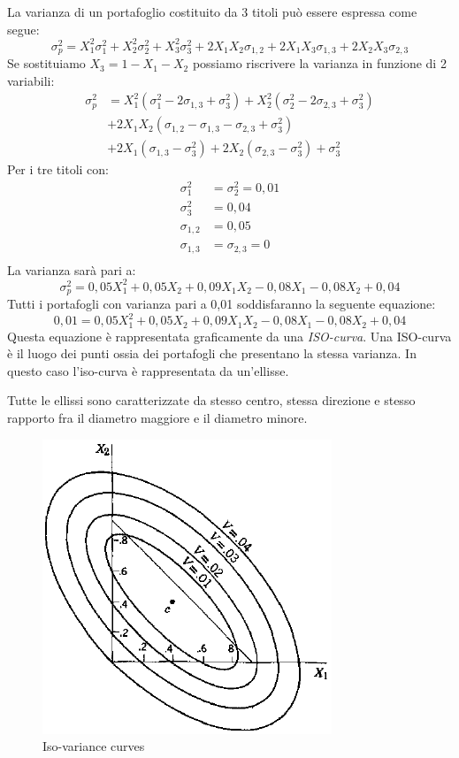 La varianza di un portafoglio costituito da 3 titoli può essere espressa come segue:
\begin{equation}
\label{key}
\sigma^{2}_{p} = X_{1}^2 \sigma^{2}_{1}+X_{2}^2 \sigma^{2}_{2}+X_{3}^2 \sigma^{2}_{3} + 2  X_{1}  X_{2}\sigma_{1,2}+2  X_{1}  X_{3}  \sigma_{1,3}+2  X_{2}  X_{3}  \sigma_{2,3} 
\end{equation}
Se sostituiamo $X_{3}= 1- X_{1}- X_{2}$ possiamo riscrivere la varianza in funzione di 2 variabili: 
\begin{equation}
\begin{split}
\label{key}
\sigma^{2}_{p} & =X_{1}^2(\sigma^{2}_{1}-2\sigma_{1,3}+\sigma^{2}_{3})+X_{2}^2(\sigma^{2}_{2}-2\sigma_{2,3}+\sigma^{2}_{3})\\
&+2X_{1}X_{2}(\sigma_{1,2}-\sigma_{1,3}-\sigma_{2,3}+\sigma^{2}_{3}) \\
&+2X_{1}(\sigma_{1,3}-\sigma^{2}_{3})+2X_{2}(\sigma_{2,3}-\sigma^{2}_{3})+\sigma^{2}_{3}
\nonumber
\end{split}
\end{equation}
Per i tre titoli con:
\begin{equation}
\begin{split}
\sigma^{2}_{1}&=\sigma^{2}_{2}=0,01 \\
\sigma^{2}_{3}&=0,04\\
\sigma_{1,2}&=0,05\\
\sigma_{1,3}&=\sigma_{2,3}=0\\
\nonumber
\end{split}
\end{equation}
La varianza sarà pari a:
\begin{equation}
\sigma^{2}_{p}= 0,05X_{1}^2 + 0,05X_{2}+0,09X_{1}X_{2}-0,08X_{1}-0,08X_{2} +0,04
\nonumber
\end{equation}
Tutti i portafogli con varianza pari a 0,01 soddisfaranno la seguente equazione:
\begin{equation}
0,01= 0,05X_{1}^2 + 0,05X_{2}+0,09X_{1}X_{2}-0,08X_{1}-0,08X_{2} +0,04
\nonumber
\end{equation}
Questa equazione è rappresentata graficamente da una \textit{ISO-curva}. Una ISO-curva è il luogo dei punti ossia dei portafogli che presentano la stessa varianza. In questo caso l'iso-curva è rappresentata da un'ellisse. 

Tutte le ellissi sono caratterizzate da stesso centro, stessa direzione e stesso rapporto fra il diametro maggiore e il diametro minore. 
\begin{figure}[h!]
	\centering
	\includegraphics[width=0.4\linewidth]{"imgs/iso variance curve"}
	\caption{Iso-variance curves}
	\label{fig:iso-variance-curve}
\end{figure}

